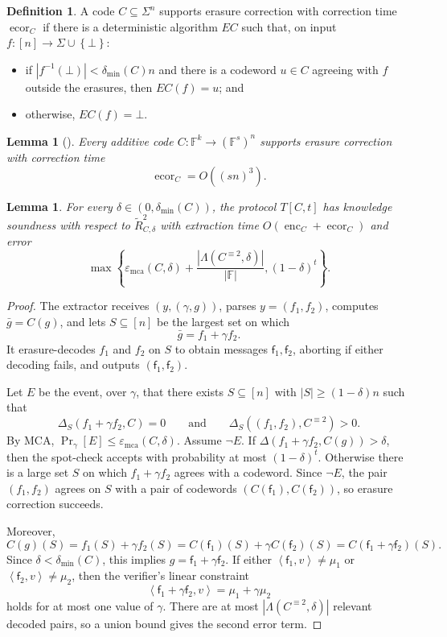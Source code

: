 \documentclass[11pt]{article}
\theoremstyle{plain}
\newtheorem{lemma}[theorem]{Lemma}
\theoremstyle{definition}
\newtheorem{definition}[theorem]{Definition}
\newcommand{\F}{\mathbb{F}}
\newcommand{\epsmca}{\varepsilon_{\mathrm{mca}}}
\newcommand{\distmin}{\delta_{\min}}
\newcommand{\set}[1]{\left\{#1\right\}}
\newcommand{\angles}[1]{\left\langle #1\right\rangle}
\newcommand{\abs}[1]{\left|#1\right|}
\DeclareMathOperator{\enc}{enc}
\DeclareMathOperator{\ecor}{ecor}
\DeclareMathOperator*{\Prb}{Pr}
\begin{document}
\begin{definition}
A code $C\subseteq\Sigma^n$ supports erasure correction with correction time $\ecor_C$ if there is a deterministic algorithm $EC$ such that, on input $f:[n]\to\Sigma\cup\set{\bot}$:
\begin{itemize}
  \item if $\abs{f^{-1}(\bot)}<\distmin(C)n$ and there is a codeword $u\in C$ agreeing with $f$ outside the erasures, then $EC(f)=u$; and
  \item otherwise, $EC(f)=\bot$.
\end{itemize}
\end{definition}

\begin{lemma}[\cite{GRS12}]
Every additive code $C:\F^k\to(\F^s)^n$ supports erasure correction with correction time
\[
  \ecor_C=O((sn)^3).
\]
\end{lemma}

\begin{lemma}
For every $\delta\in(0,\distmin(C))$, the protocol $T[C,t]$ has knowledge soundness with respect to $\widetilde R_{C,\delta}^2$ with extraction time $O(\enc_C+\ecor_C)$ and error
\[
  \max\left\{
    \epsmca(C,\delta)+\frac{\abs{\Lambda(C^{\equiv2},\delta)}}{\abs{\F}},
    (1-\delta)^t
  \right\}.
\]
\end{lemma}

\begin{proof}
The extractor receives $(y,(\gamma,g))$, parses $y=(f_1,f_2)$, computes $\bar g=C(g)$, and lets $S\subseteq[n]$ be the largest set on which
\[
  \bar g=f_1+\gamma f_2.
\]
It erasure-decodes $f_1$ and $f_2$ on $S$ to obtain messages $\mathsf{f}_1,\mathsf{f}_2$, aborting if either decoding fails, and outputs $(\mathsf{f}_1,\mathsf{f}_2)$.

Let $E$ be the event, over $\gamma$, that there exists $S\subseteq[n]$ with $\abs{S}\ge(1-\delta)n$ such that
\[
  \Delta_S(f_1+\gamma f_2,C)=0
  \qquad\text{and}\qquad
  \Delta_S((f_1,f_2),C^{\equiv2})>0.
\]
By MCA, $\Prb_\gamma[E]\le\epsmca(C,\delta)$. Assume $\neg E$. If $\Delta(f_1+\gamma f_2,C(g))>\delta$, then the spot-check accepts with probability at most $(1-\delta)^t$. Otherwise there is a large set $S$ on which $f_1+\gamma f_2$ agrees with a codeword. Since $\neg E$, the pair $(f_1,f_2)$ agrees on $S$ with a pair of codewords $(C(\mathsf{f}_1),C(\mathsf{f}_2))$, so erasure correction succeeds.

Moreover,
\[
 C(g)(S)=f_1(S)+\gamma f_2(S)=C(\mathsf{f}_1)(S)+\gamma C(\mathsf{f}_2)(S)=C(\mathsf{f}_1+\gamma\mathsf{f}_2)(S).
\]
Since $\delta<\distmin(C)$, this implies $g=\mathsf{f}_1+\gamma\mathsf{f}_2$. If either $\angles{\mathsf{f}_1,v}\ne\mu_1$ or $\angles{\mathsf{f}_2,v}\ne\mu_2$, then the verifier's linear constraint
\[
  \angles{\mathsf{f}_1+\gamma\mathsf{f}_2,v}=\mu_1+\gamma\mu_2
\]
holds for at most one value of $\gamma$. There are at most $\abs{\Lambda(C^{\equiv2},\delta)}$ relevant decoded pairs, so a union bound gives the second error term.
\end{proof}
\end{document}
